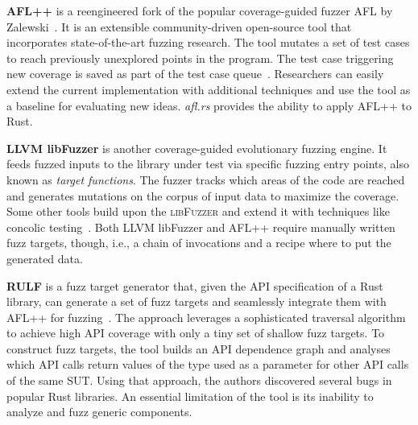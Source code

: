 \documentclass[paper=a4,%
  twoside,%
  BCOR4mm,%
  abstract=true,%
  toc=bibliography,%
  chapterprefix=true,%
  toc=bibliographynumbered,%
  open=right,%
  english,%
  pagesize=pdftex]{scrreprt}
\newcommand{\sut}{\ac{SUT}\xspace}
\begin{document}
\textbf{AFL++} is a reengineered fork of the popular coverage-guided fuzzer \textsc{AFL} by Zalewski~\cite{Zalewski2014}. It is an extensible community-driven open-source tool that incorporates state-of-the-art fuzzing research. The tool mutates a set of test cases to reach previously unexplored points in the program. The test case triggering new coverage is saved as part of the test case queue~\cite{Fioraldi2020}. Researchers can easily extend the current implementation with additional techniques and use the tool as a baseline for evaluating new ideas. \emph{afl.rs} provides the ability to apply \textsc{AFL++} to Rust.

\textbf{LLVM libFuzzer} is another coverage-guided evolutionary fuzzing engine. It feeds fuzzed inputs to the library under test via specific fuzzing entry points, also known as \emph{target functions}. The fuzzer tracks which areas of the code are reached and generates mutations on the corpus of input data to maximize the coverage. Some other tools build upon the \textsc{libFuzzer} and extend it with techniques like concolic testing~\cite{Rocha2020,Le2019}. Both LLVM libFuzzer and \textsc{AFL++} require manually written fuzz targets, though, i.e., a chain of invocations and a recipe where to put the generated data.

\textbf{RULF} is a fuzz target generator that, given the \ac{API} specification of a Rust library, can generate a set of fuzz targets and seamlessly integrate them with \textsc{AFL++} for fuzzing~\cite{Jiang2021}. The approach leverages a sophisticated traversal algorithm to achieve high \ac{API} coverage with only a tiny set of shallow fuzz targets. To construct fuzz targets, the tool builds an \ac{API} dependence graph and analyses which \ac{API} calls return values of the type used as a parameter for other \ac{API} calls of the same \sut. Using that approach, the authors discovered several bugs in popular Rust libraries. An essential limitation of the tool is its inability to analyze and fuzz generic components.
\end{document}
